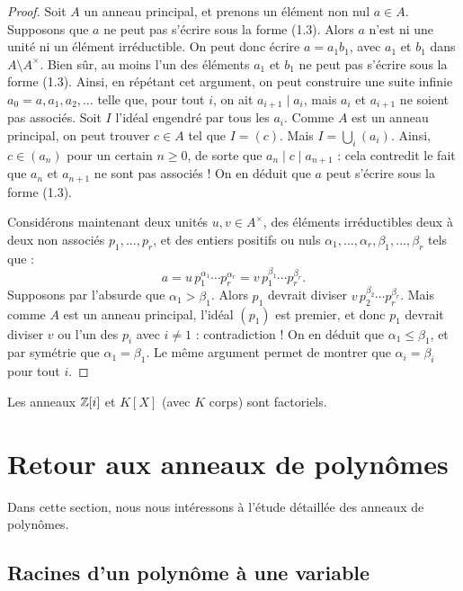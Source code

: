 \documentclass[]{report}
\begin{document}
\begin{proof}
    Soit $A$ un anneau principal, et prenons un élément non nul $a \in A$. Supposons que $a$ ne peut pas s'écrire sous la forme (1.3). Alors $a$ n'est ni une unité ni un élément irréductible. On peut donc écrire $a = a_1 b_1$, avec $a_1$ et $b_1$ dans $A \setminus A^{\times}$. Bien sûr, au moins l'un des éléments $a_1$ et $b_1$ ne peut pas s'écrire sous la forme (1.3). Ainsi, en répétant cet argument, on peut construire une suite infinie $a_0 = a, a_1, a_2, \ldots$ telle que, pour tout $i$, on ait $a_{i+1} \mid a_i$, mais $a_i$ et $a_{i+1}$ ne soient pas associés. Soit $I$ l'idéal engendré par tous les $a_i$. Comme $A$ est un anneau principal, on peut trouver $c \in A$ tel que $I = (c)$. Mais $I = \bigcup_i (a_i)$. Ainsi, $c \in (a_n)$ pour un certain $n \ge 0$, de sorte que $a_n \mid c \mid a_{n+1}$ : cela contredit le fait que $a_n$ et $a_{n+1}$ ne sont pas associés ! On en déduit que $a$ peut s'écrire sous la forme (1.3).

    Considérons maintenant deux unités $u, v \in A^{\times}$, des éléments irréductibles deux à deux non associés $p_1, \ldots, p_r$, et des entiers positifs ou nuls $\alpha_1, \ldots, \alpha_r, \beta_1, \ldots, \beta_r$ tels que :
    \[a = u \, p_1^{\alpha_1} \cdots p_r^{\alpha_r} = v \, p_1^{\beta_1} \cdots p_r^{\beta_r}.\]
    Supposons par l'absurde que $\alpha_1 > \beta_1$. Alors $p_1$ devrait diviser $v \, p_2^{\beta_2} \cdots p_r^{\beta_r}$. Mais comme $A$ est un anneau principal, l'idéal $(p_1)$ est premier, et donc $p_1$ devrait diviser $v$ ou l'un des $p_i$ avec $i \ne 1$ : contradiction ! On en déduit que $\alpha_1 \le \beta_1$, et par symétrie que $\alpha_1 = \beta_1$. Le même argument permet de montrer que $\alpha_i = \beta_i$ pour tout $i$.
\end{proof}

\begin{cor}{}{}
    Les anneaux $\mathbb{Z}[i]$ et $K[X]$ (avec $K$ corps) sont factoriels.
\end{cor}

\section{Retour aux anneaux de polynômes}

Dans cette section, nous nous intéressons à l'étude détaillée des anneaux de polynômes.

\subsection{Racines d'un polynôme à une variable}
\end{document}
